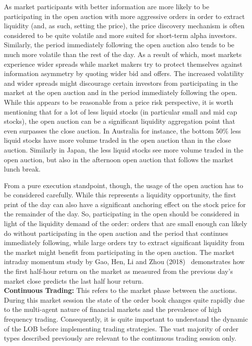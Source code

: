 As market participants with better information are more likely to be participating in the open auction with more aggressive orders in order to extract liquidity (and, as such, setting the price), the price discovery mechanism is often considered to be quite volatile and more suited for short-term alpha investors. Similarly, the period immediately following the open auction also tends to be much more volatile than the rest of the day. As a result of which, most markets experience wider spreads while market makers try to protect themselves against information asymmetry by quoting wider bid and offers. The increased volatility and wider spreads might discourage certain investors from participating in the market at the open auction and in the period immediately following the open. While this appears to be reasonable from a price risk perspective, it is worth mentioning that for a lot of less liquid stocks (in particular small and mid cap stocks), the open auction can be a significant liquidity aggregation point that even surpasses the close auction. In Australia for instance, the bottom 50\% less liquid stocks have more volume traded in the open auction than in the close auction. Similarly in Japan, the less liquid stocks see more volume traded in the open auction, but also in the afternoon open auction that follows the market lunch break.


From a pure execution standpoint, though, the usage of the open auction has to be considered carefully. While this represents a liquidity opportunity, the first print of the day can also have a significant anchoring effect on the stock price for the remainder of the day. So, participating in the open should be considered in light of the liquidity demand of the order: orders that are small enough can likely do without participating in the open auction and the period that continues immediately following, while large orders try to extract significant liquidity from the market might benefit from participating in the open auction. The market intraday momentum study by Gao, Hen, Li and Zhou (2018)~\cite{ghliz} demonstrates how the first half-hour return on the market as measured from the previous day's market close predicts the last half hour return. \\



\noindent\textbf{Continuous Trading:} This refers to the market phase between the auctions. During this market session  the state of the order book changes quite rapidly due to the multi-agent nature of financial markets and the prevalence of high frequency trading. Consequently, it is quite important to understand the dynamic of the LOB before implementing trading strategies. The vast majority of order types described previously are relevant to the continuous trading session only. \\

